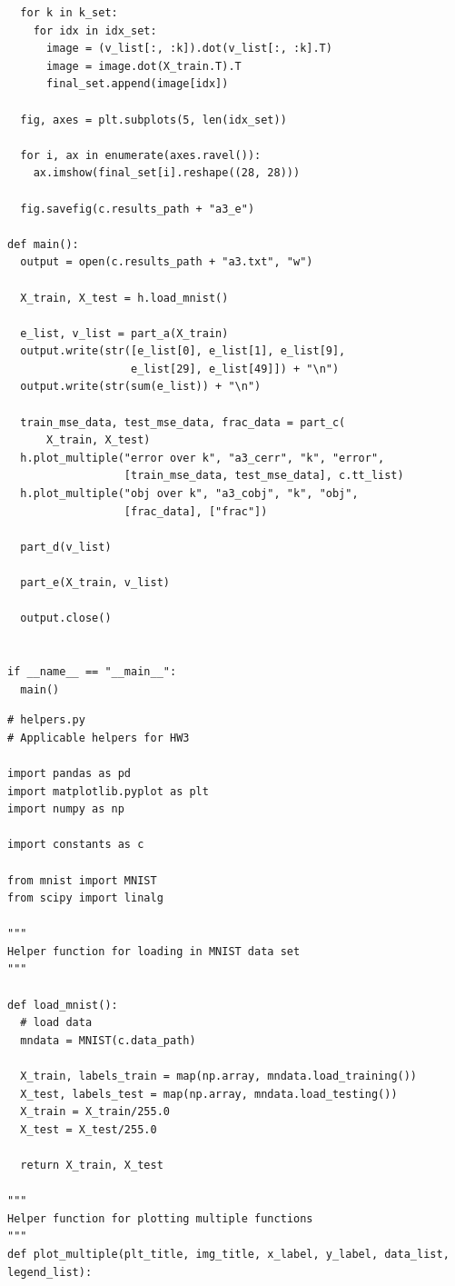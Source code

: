 \documentclass{article}
\newcommand{\1}{\mathbf{1}}
\begin{document}
{\begin{verbatim}
  for k in k_set:
    for idx in idx_set:
      image = (v_list[:, :k]).dot(v_list[:, :k].T)
      image = image.dot(X_train.T).T
      final_set.append(image[idx])

  fig, axes = plt.subplots(5, len(idx_set))

  for i, ax in enumerate(axes.ravel()):
    ax.imshow(final_set[i].reshape((28, 28)))

  fig.savefig(c.results_path + "a3_e")

def main():
  output = open(c.results_path + "a3.txt", "w")

  X_train, X_test = h.load_mnist()

  e_list, v_list = part_a(X_train)
  output.write(str([e_list[0], e_list[1], e_list[9],
                   e_list[29], e_list[49]]) + "\n")
  output.write(str(sum(e_list)) + "\n")

  train_mse_data, test_mse_data, frac_data = part_c(
      X_train, X_test)
  h.plot_multiple("error over k", "a3_cerr", "k", "error", 
                  [train_mse_data, test_mse_data], c.tt_list)
  h.plot_multiple("obj over k", "a3_cobj", "k", "obj", 
                  [frac_data], ["frac"])

  part_d(v_list) 

  part_e(X_train, v_list)

  output.close()


if __name__ == "__main__":
  main()

\end{verbatim}

\begin{verbatim}
# helpers.py
# Applicable helpers for HW3

import pandas as pd
import matplotlib.pyplot as plt
import numpy as np

import constants as c

from mnist import MNIST
from scipy import linalg

"""
Helper function for loading in MNIST data set
"""

def load_mnist():
  # load data
  mndata = MNIST(c.data_path)

  X_train, labels_train = map(np.array, mndata.load_training())
  X_test, labels_test = map(np.array, mndata.load_testing())
  X_train = X_train/255.0
  X_test = X_test/255.0

  return X_train, X_test

"""
Helper function for plotting multiple functions
"""
def plot_multiple(plt_title, img_title, x_label, y_label, data_list, legend_list):
  

\end{verbatim}}
\end{document}
